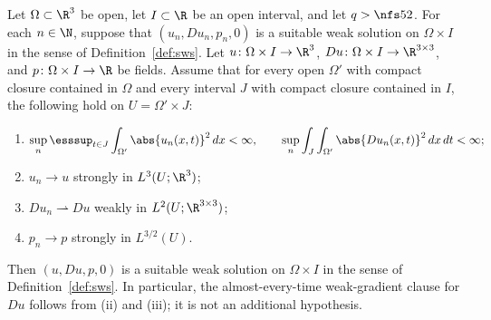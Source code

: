 \documentclass[11pt,reqno]{amsart}
\begin{document}
\begin{theorem}\label{thm:stability}
Let $\Omega\subset\R^3$ be open, let $I\subset\R$ be an open interval, and
let $q>\nfs52$. For each $n\in\N$, suppose that
$(u_n,Du_n,p_n,0)$ is a suitable weak solution on $\Omega\times I$ in the
sense of Definition~\ref{def:sws}. Let
$u\colon\Omega\times I\to\R^3$,
$Du\colon\Omega\times I\to\R^{3\times3}$, and
$p\colon\Omega\times I\to\R$ be fields. Assume that for every open
$\Omega'$ with compact closure contained in $\Omega$ and every interval $J$
with compact closure contained in $I$, the following hold on
$U=\Omega'\times J$:
\begin{enumerate}[label=(\roman*)]
\item
\[
 \sup_n\esssup_{t\in J}\int_{\Omega'}\abs{u_n(x,t)}^2\,dx<\infty,
 \qquad
 \sup_n\int_J\int_{\Omega'}\abs{Du_n(x,t)}^2\,dx\,dt<\infty;
\]
\item $u_n\to u$ strongly in $L^3(U;\R^3)$;
\item $Du_n\rightharpoonup Du$ weakly in $L^2(U;\R^{3\times3})$;
\item $p_n\to p$ strongly in $L^{3/2}(U)$.
\end{enumerate}
Then $(u,Du,p,0)$ is a suitable weak solution on $\Omega\times I$ in the
sense of Definition~\ref{def:sws}. In particular, the almost-every-time
weak-gradient clause for $Du$ follows from (ii) and (iii); it is not an
additional hypothesis.
\end{theorem}
\end{document}
